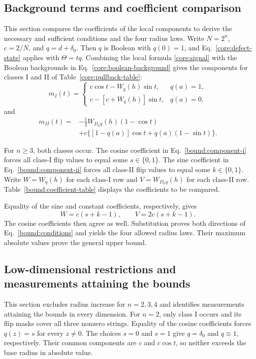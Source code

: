 \subsection{Background terms and coefficient comparison}
\label{bound:app-coefficients}
This section compares the coefficients of the local components to derive the necessary and sufficient conditions and the four radius laws. Write $N=2^n$, $c=2/N$, and $q=d+\delta_0$.
Then $q$ is Boolean with $q(0)=1$, and Eq.~\eqref{core:defect-state}
applies with $\Theta=tq$. Combining the local formula
\eqref{core:signal} with the Boolean backgrounds in
Eq.~\eqref{core:boolean-background} gives the components for
classes I and II of Table~\ref{core:pullback-table}:
\begin{equation}
 m_I(t)=\begin{cases}
 c\cos t-W_q(h)\sin t,&q(a)=1,\\
 c-[c+W_q(h)]\sin t,&q(a)=0,
 \end{cases}
 \label{bound:component-i}
\end{equation}
and
\begin{equation}
 \begin{split}
 m_{II}(t)={}&-\tfrac12W_{D_aq}(h)(1-\cos t)\\
 &+c\bigl\{[1-q(a)]\cos t+q(a)(1-\sin t)\bigr\}.
 \end{split}
 \label{bound:component-ii}
\end{equation}

For $n\ge3$, both classes occur.  The cosine coefficient in
Eq.~\eqref{bound:component-i} forces all class-I flip values to equal
some $s\in\{0,1\}$.  The sine coefficient in
Eq.~\eqref{bound:component-ii} forces all class-II flip values to
equal some $k\in\{0,1\}$.  Write $W=W_q(h)$ for each class-I row and $V=W_{D_aq}(h)$ for each class-II row. Table~\ref{bound:coefficient-table} displays the coefficients to be compared.

Equality of the sine and constant coefficients, respectively, gives
\begin{equation}
 W=c(s+k-1),\qquad V=2c(s+k-1).
 \label{bound:coefficient-equalities}
\end{equation}
The cosine coefficients then agree as well. Substitution proves both directions of Eq.~\eqref{bound:conditions} and yields the four allowed radius laws.
Their maximum absolute values prove the general upper bound.

\subsection{Low-dimensional restrictions and measurements attaining the bounds}
\label{bound:app-sharpness}
This section excludes radius increase for $n=2,3,4$ and identifies measurements attaining the bounds in every dimension.
For $n=2$, only class I occurs and its flip masks cover all three
nonzero strings.  Equality of the cosine coefficients forces
$q(z)=s$ for every $z\ne0$.  The choices $s=0$ and $s=1$
give $q=\delta_0$ and $q\equiv1$, respectively.
Their common components are $c$ and $c\cos t$, so neither exceeds
the base radius in absolute value.

